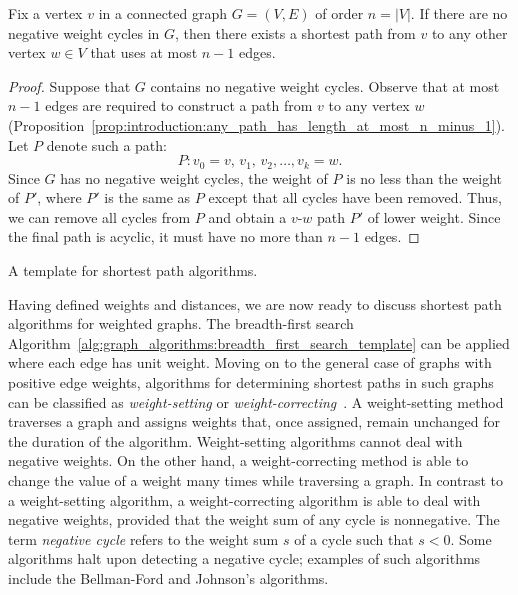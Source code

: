 \begin{lemma}
\label{lem:graph_algorithms:shortest_path_length}
Fix a vertex $v$ in a connected graph $G = (V,E)$ of order
$n = |V|$. If there are no negative weight
cycles in $G$, then there exists a shortest
path from $v$ to any other vertex $w \in V$ that
uses at most $n - 1$ edges.
\end{lemma}

\begin{proof}
Suppose that $G$ contains no negative weight cycles. Observe that at
most $n - 1$ edges are required to construct a path from $v$ to any
vertex $w$
(Proposition~\ref{prop:introduction:any_path_has_length_at_most_n_minus_1}).
Let $P$ denote such a path:
\[
P: v_0 = v,\, v_1,\, v_2, \dots, v_k = w.
\]
Since $G$ has no negative weight cycles, the
weight of $P$ is no less than the weight of $P'$, where $P'$ is the
same as $P$ except that all cycles have been removed. Thus, we can
remove all cycles from $P$ and obtain a $v$-$w$ path $P'$
of lower weight. Since the final path is acyclic, it must have no more
than $n - 1$ edges.
\end{proof}

\begin{algorithm}[!htbp]

\caption{A template for shortest path algorithms.}
\label{alg:graph_algorithms:generic_shortest_path_algorithm}
\end{algorithm}

Having defined weights and distances, we
are now ready to discuss shortest path algorithms
for weighted graphs. The breadth-first
search
Algorithm~\ref{alg:graph_algorithms:breadth_first_search_template} can
be applied where each edge has unit weight. Moving
on to the general case of graphs with positive edge
weights, algorithms for determining shortest
paths in such graphs can be classified as
\emph{weight-setting} or
\emph{weight-correcting}~\cite{GalloPallottino1986}.
A weight-setting method traverses a graph and
assigns weights that, once assigned, remain unchanged for the duration
of the algorithm. Weight-setting algorithms
cannot deal with negative weights. On the other
hand, a weight-correcting method is able to
change the value of a weight many times while traversing a graph. In
contrast to a weight-setting algorithm, a
weight-correcting algorithm is able to deal
with negative weights, provided that the weight
sum of any cycle is
nonnegative. The term
\emph{negative cycle} refers to the weight sum
$s$ of a cycle such that $s < 0$. Some algorithms halt
upon detecting a negative cycle; examples of such algorithms include
the Bellman-Ford and
Johnson's algorithms.

